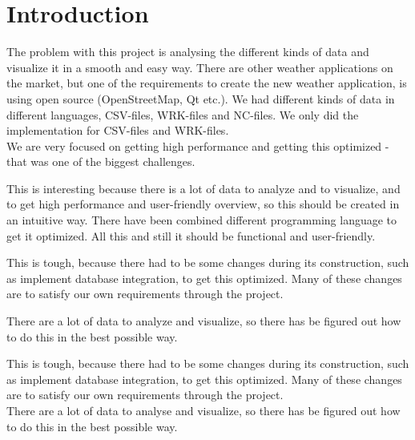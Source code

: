 \chapter{Introduction}
\label{sec:introduction}



The problem with this project is analysing the different kinds of data and visualize it in a smooth and easy way. There are other weather applications on the market, but one of the requirements to create the new weather application, is using open source (OpenStreetMap, Qt etc.). We had different kinds of data in different languages, CSV-files, WRK-files and NC-files. We only did the implementation for CSV-files and WRK-files.\\
We are very focused on getting high performance and getting this optimized - that was one of the biggest challenges.

This is interesting because there is a lot of data to analyze and to visualize, and to get high performance and user-friendly overview, so this should be created in an intuitive way. There have been combined different programming language to get it optimized. All this and still it should be functional and user-friendly.

This is tough, because there had to be some changes during its construction, such as implement database integration, to get this optimized. Many of these changes are to satisfy our own requirements through the project.

There are a lot of data to analyze and visualize, so there has be figured out how to do this in the best possible way.

This is tough, because there had to be some changes during its construction, such as implement database integration, to get this optimized. Many of these changes are to satisfy our own requirements through the project.\\
There are a lot of data to analyse and visualize, so there has be figured out how to do this in the best possible way.

